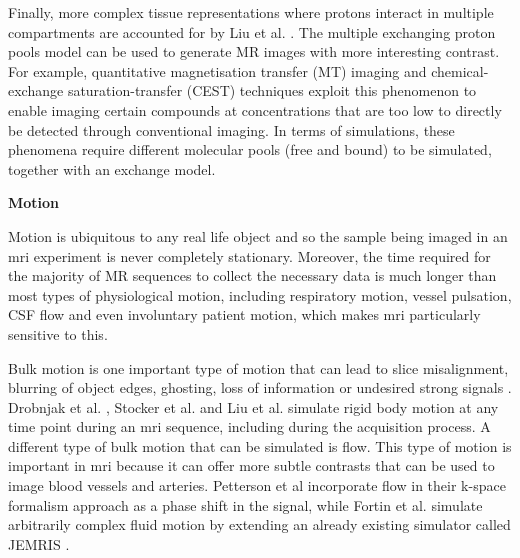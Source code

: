 \hfill

Finally, more complex tissue representations where protons interact in multiple compartments are accounted for by Liu et al. \cite{Liu2017}. 
The multiple exchanging proton pools model can be used to generate MR images with more interesting contrast.
For example, quantitative magnetisation transfer (MT) imaging and chemical-exchange saturation-transfer (CEST) techniques exploit this phenomenon to enable imaging certain compounds at concentrations that are too low to directly be detected through conventional imaging.
In terms of simulations, these phenomena require different molecular pools (free and bound) to be simulated, together with an exchange model.


\hfill

\large \textbf{Motion} \normalsize

Motion is ubiquitous to any real life object and so the sample being imaged in an \ac{mri} experiment is never completely stationary.
Moreover, the time required for the majority of MR sequences to collect the necessary data is much longer than most types of physiological motion, including respiratory motion, vessel pulsation, CSF flow and even involuntary patient motion, which makes \ac{mri} particularly sensitive to this.

\hfill

Bulk motion is one important type of motion that can lead to slice misalignment, blurring of object edges, ghosting, loss of information or undesired strong signals \cite{Zaitsev2015}.
Drobnjak et al. \cite{Drobnjak2006}, Stocker et al. \cite{Stocker2010} and Liu et al. \cite{Liu2017} simulate rigid body motion at any time point during an \ac{mri} sequence, including during the acquisition process.
A different type of bulk motion that can be simulated is flow.
This type of motion is important in \ac{mri} because it can offer more subtle contrasts that can be used to image blood vessels and arteries.
Petterson et al \cite{Petersson1993} incorporate flow in their k-space formalism approach as a phase shift in the signal, while 
Fortin et al. \cite{Fortin2016} simulate arbitrarily complex fluid motion by extending an already existing simulator called JEMRIS \cite{Stocker2010}.

